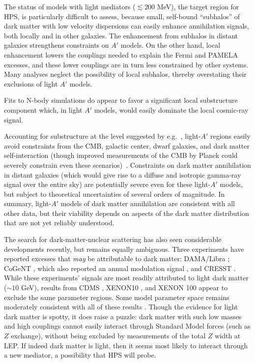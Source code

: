 The status of models with light mediators ($\lesssim 200$ MeV), the target region for HPS, is particularly difficult to assess, because small, self-bound ``subhalos'' of dark matter with low velocity dispersions can easily enhance annihilation signals, both locally and in other galaxies.  The enhancement from subhalos in distant galaxies strengthens constraints on $A'$ models.  On the other hand, local enhancement lowers the couplings needed to explain the Fermi and PAMELA excesses, and these lower couplings are in turn less constrained by other systems.  Many analyses neglect the possibility of local subhalos, thereby overstating their exclusions of light $A'$ models.

Fits to N-body simulations do appear to favor a significant local substructure component \cite{Pieri:2009je,Kistler:2009xf,Kamionkowski:2010mi} which, in light $A'$ models, would easily dominate the local cosmic-ray signal.
	

Accounting for substructure at the level suggested by e.g.~\cite{Kamionkowski:2010mi},  light-$A'$ regions easily avoid constraints from the CMB, galactic center, dwarf galaxies, and dark matter self-interaction (though improved measurements of the CMB by Planck could severely constrain even these scenarios)~\cite{Slatyer:2011kg}.   Constraints on dark matter annihilation in distant galaxies (which would give rise to a diffuse and isotropic gamma-ray signal over the entire sky) are potentially severe even for these light-$A'$ models, but subject to theoretical uncertainties of several orders of magnitude.  In summary, light-$A'$ models of dark matter annihilation are consistent with all other data, but their viability depends on aspects of the dark matter distribution that are not yet reliably understood.

 

The search for dark-matter-nuclear scattering has also seen considerable developments recently, but remains equally ambiguous.  Three experiments have reported excesses that \emph{may} be attributable to dark matter: DAMA/Libra \cite{Bernabei:2010mq}; CoGeNT \cite{Aalseth:2010vx}, which also reported an annual modulation signal \cite{Aalseth:2011wp}, and CRESST \cite{Angloher:2011uu}.   While these experiments' signals are most readily attributed to light dark matter ($\sim 10$ GeV), results from CDMS \cite{CDMS}, XENON10 \cite{Angle:2011th}, and XENON 100 \cite{Aprile:2011hi} appear to exclude the same parameter regions.  Some model parameter space remains moderately consistent with all of these results \cite{Kelso:2011gd}.  Though the evidence for light dark matter is spotty, it does raise a puzzle: dark matter with such low masses and high couplings cannot easily interact through Standard Model forces (such as $Z$ exchange), without being excluded by measurements of the total $Z$ width at LEP. If indeed dark matter is light, then it seems most likely to interact through a new mediator, a possibility that HPS will probe.

